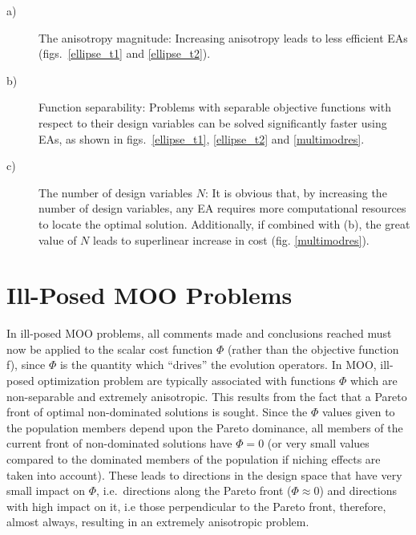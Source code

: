 \begin{description}
  \item[a)] The anisotropy magnitude: Increasing anisotropy leads to less efficient EAs (figs.\ \ref{ellipse_t1} and \ref{ellipse_t2}).    
  \item[b)] Function separability: Problems with separable objective functions with respect to their design variables can be solved significantly faster using EAs, as shown in figs.\ \ref{ellipse_t1}, \ref{ellipse_t2} and \ref{multimodres}.  
  \item[c)] The number of design variables $N$: It is obvious that, by increasing the number of design variables, any EA requires more computational resources to locate the optimal solution. Additionally, if combined with (b), the great value of $N$ leads to superlinear increase in cost (fig. \ref{multimodres}).  
\end{description}

\section{Ill-Posed MOO Problems}
\label{VCMM}
In ill-posed MOO problems, all comments made and conclusions reached must now be applied to the scalar cost function $\Phi$ (rather than the objective function f), since $\Phi$ is the quantity which ``drives'' the evolution operators. In MOO, ill-posed optimization problem are typically associated with functions $\Phi$ which are non-separable and extremely anisotropic. This results from the fact that a Pareto front of optimal non-dominated solutions is sought. Since the $\Phi$ values given to the population members depend upon the Pareto dominance, all members of the current front of non-dominated solutions have $\Phi\!=\!0$ (or very small values compared to the dominated members of the population if niching effects are taken into account). These leads to directions in the design space that have very small impact on $\Phi$, i.e.\ directions along the Pareto front ($\Phi\!\approx\!0$) and directions with high impact on it, i.e those perpendicular to the Pareto front, therefore, almost always, resulting in an extremely anisotropic problem. 

